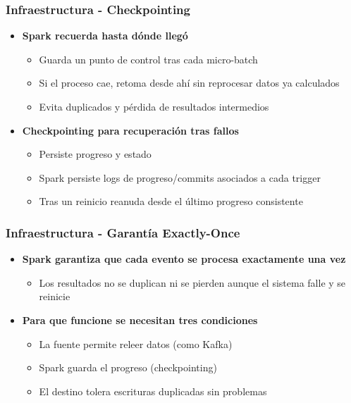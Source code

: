\documentclass[aspectratio=169]{beamer}
\begin{document}
\begin{frame}\frametitle{Infraestructura - Checkpointing}
	\begin{itemize}
		\item \textbf{Spark recuerda hasta dónde llegó}
		\begin{itemize}
			\item Guarda un punto de control tras cada micro-batch
			\item Si el proceso cae, retoma desde ahí sin reprocesar datos ya calculados
			\item Evita duplicados y pérdida de resultados intermedios
		\end{itemize}

		\vspace{1em}

		\item \textbf{Checkpointing para recuperación tras fallos}
		\begin{itemize}
			\item Persiste progreso y estado
			\item Spark persiste logs de progreso/commits asociados a cada trigger
			\item Tras un reinicio reanuda desde el último progreso consistente
		\end{itemize}
	\end{itemize}
\end{frame}



\begin{frame}\frametitle{Infraestructura - Garantía Exactly-Once}
	\begin{itemize}
		\item \textbf{Spark garantiza que cada evento se procesa exactamente una vez}
		\begin{itemize}
			\item Los resultados no se duplican ni se pierden aunque el sistema falle y se reinicie
		\end{itemize}

		\vspace{1em}

		\item \textbf{Para que funcione se necesitan tres condiciones}
		\begin{itemize}
			\item La fuente permite releer datos (como Kafka)
			\item Spark guarda el progreso (checkpointing)
			\item El destino tolera escrituras duplicadas sin problemas
		\end{itemize}
	\end{itemize}
\end{frame}
\end{document}
